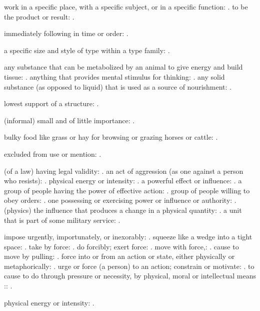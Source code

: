   work in a specific place, with a specific subject, or in a specific function: . to be the product or result: .

  immediately following in time or order: .

  a specific size and style of type within a type family: .

  any substance that can be metabolized by an animal to give energy and build tissue: . anything that provides mental stimulus for thinking: . any solid substance (as opposed to liquid) that is used as a source of nourishment: .

  lowest support of a structure: .

  (informal) small and of little importance: .

  bulky food like grass or hay for browsing or grazing horses or cattle: .

  excluded from use or mention: .

  (of a law) having legal validity: . an act of aggression (as one against a person who resists): . physical energy or intensity: . a powerful effect or influence: . a group of people having the power of effective action: . group of people willing to obey orders: . one possessing or exercising power or influence or authority: . (physics) the influence that produces a change in a physical quantity: . a unit that is part of some military service: .

  impose urgently, importunately, or inexorably: . squeeze like a wedge into a tight space: . take by force: . do forcibly; exert force: . move with force,: . cause to move by pulling: . force into or from an action or state, either physically or metaphorically: . urge or force (a person) to an action; constrain or motivate: . to cause to do through pressure or necessity, by physical, moral or intellectual means :: .

  physical energy or intensity: .

